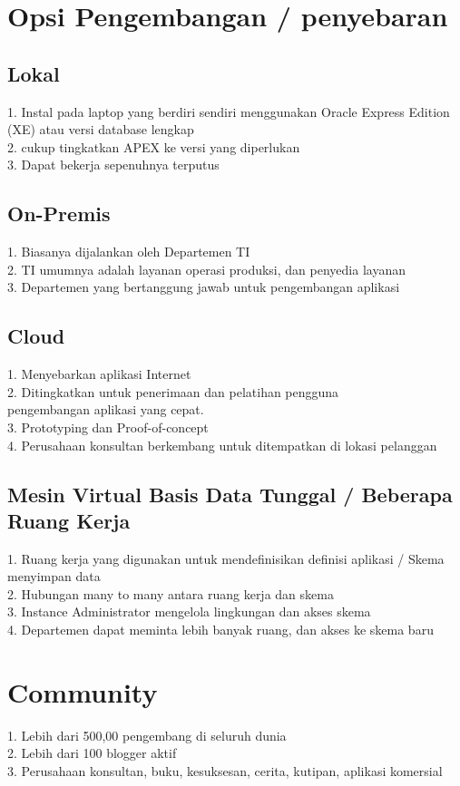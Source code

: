 \documentclass [12pt, times new roman, a4paper]{article}
\begin{document}
\section{Opsi Pengembangan / penyebaran}
\subsection{Lokal}
1. Instal pada laptop yang berdiri sendiri menggunakan Oracle Express Edition (XE) atau versi database lengkap\\
2. cukup tingkatkan APEX ke versi yang diperlukan\\
3. Dapat bekerja sepenuhnya terputus\\
\subsection{On-Premis}
1. Biasanya dijalankan oleh Departemen TI\\
2. TI umumnya adalah layanan operasi produksi, dan penyedia layanan\\
3. Departemen yang bertanggung jawab untuk pengembangan aplikasi\\
\subsection{Cloud}
1. Menyebarkan aplikasi Internet\\
2. Ditingkatkan untuk penerimaan dan pelatihan pengguna\\ pengembangan aplikasi yang cepat.\\
3. Prototyping dan Proof-of-concept\\
4. Perusahaan konsultan berkembang untuk ditempatkan di lokasi pelanggan\\
\subsection{Mesin Virtual Basis Data Tunggal / Beberapa Ruang Kerja}
1. Ruang kerja yang digunakan untuk mendefinisikan definisi aplikasi / Skema menyimpan data\\
2. Hubungan many to many antara ruang kerja dan skema\\
3. Instance Administrator mengelola lingkungan dan akses skema\\
4. Departemen dapat meminta lebih banyak ruang, dan akses ke skema baru\\
\section{Community}
1. Lebih dari 500,00 pengembang di seluruh dunia\\
2. Lebih dari 100 blogger aktif\\
3. Perusahaan konsultan, buku, kesuksesan, cerita, kutipan, aplikasi komersial\\
\end{document}
